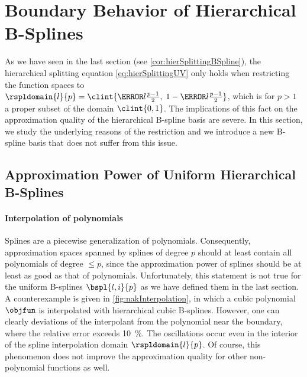 \section{Boundary Behavior of Hierarchical B-Splines}
\label{sec:32notAKnot}

As we have seen in the last section (see \cref{cor:hierSplittingBSpline}),
the hierarchical splitting equation \eqref{eq:hierSplittingUV}
only holds when restricting the function spaces to
$\rspldomain{l}{p} = \clint{\ms{l} \tfrac{p-1}{2},\; 1 - \ms{l} \tfrac{p-1}{2}}$,
which is for $p > 1$ a proper subset of the domain $\clint{0, 1}$.
The implications of this fact on the approximation quality
of the hierarchical B-spline basis are severe.
In this section, we study the underlying reasons of the restriction and
we introduce a new B-spline basis that does not suffer from this issue.



\subsection{Approximation Power of Uniform Hierarchical B-Splines}
\label{sec:321approximation}


\paragraph{Interpolation of polynomials}

Splines are a piecewise generalization of polynomials.
Consequently, approximation spaces spanned by splines of degree $p$ should
at least contain all polynomials of degree $\le p$,
since the approximation power of splines should be at least as good
as that of polynomials.
Unfortunately, this statement is not true for the uniform B-splines
$\bspl{l,i}{p}$ as we have defined them in the last section.
A counterexample is given in \cref{fig:nakInterpolation},
in which a cubic polynomial $\objfun$ is interpolated with
hierarchical cubic B-splines.
However, one can clearly deviations of the interpolant from the polynomial
near the boundary, where the relative error exceeds \SI{10}{\percent}.
The oscillations occur even in the interior of the
spline interpolation domain $\rspldomain{l}{p}$.
Of course, this phenomenon does not improve the approximation quality
for other non-polynomial functions as well.

